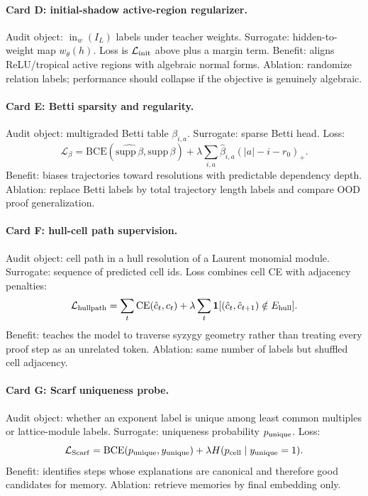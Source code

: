 \documentclass[11pt]{article}
\theoremstyle{definition}
\begin{document}
\paragraph{Card D: initial-shadow active-region regularizer.}
Audit object: \(\operatorname{in}_w(I_L)\) labels under teacher weights.  Surrogate: hidden-to-weight map \(w_\theta(h)\).  Loss is \(\mathcal L_{\rm init}\) above plus a margin term.  Benefit: aligns ReLU/tropical active regions with algebraic normal forms.  Ablation: randomize relation labels; performance should collapse if the objective is genuinely algebraic.

\paragraph{Card E: Betti sparsity and regularity.}
Audit object: multigraded Betti table \(\beta_{i,a}\).  Surrogate: sparse Betti head.  Loss:
\[
\mathcal L_{\beta}=\mathrm{BCE}(\widehat{\mathrm{supp}\,\beta},\mathrm{supp}\,\beta)
+\lambda\sum_{i,a}\widehat\beta_{i,a}(|a|-i-r_0)_+.
\]
Benefit: biases trajectories toward resolutions with predictable dependency depth.  Ablation: replace Betti labels by total trajectory length labels and compare OOD proof generalization.

\paragraph{Card F: hull-cell path supervision.}
Audit object: cell path in a hull resolution of a Laurent monomial module.  Surrogate: sequence of predicted cell ids.  Loss combines cell CE with adjacency penalties:
\[
\mathcal L_{\rm hullpath}=\sum_t \mathrm{CE}(\hat c_t,c_t)+\lambda\sum_t \mathbf 1[(\hat c_t,\hat c_{t+1})\notin E_{\rm hull}].
\]
Benefit: teaches the model to traverse syzygy geometry rather than treating every proof step as an unrelated token.  Ablation: same number of labels but shuffled cell adjacency.

\paragraph{Card G: Scarf uniqueness probe.}
Audit object: whether an exponent label is unique among least common multiples or lattice-module labels.  Surrogate: uniqueness probability \(p_{\rm unique}\).  Loss:
\[
\mathcal L_{\rm Scarf}=\mathrm{BCE}(p_{\rm unique},y_{\rm unique})+\lambda H(p_{\rm cell}\mid y_{\rm unique}=1).
\]
Benefit: identifies steps whose explanations are canonical and therefore good candidates for memory.  Ablation: retrieve memories by final embedding only.
\end{document}
